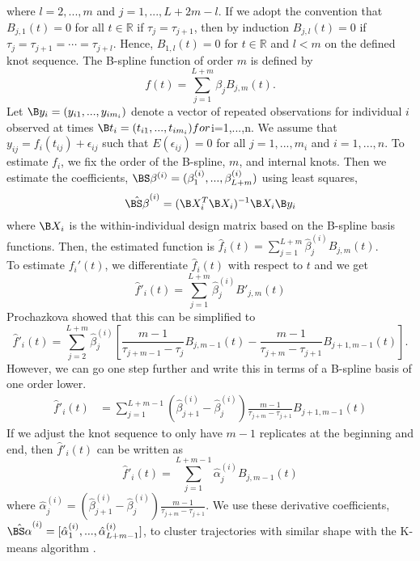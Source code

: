 where $l=2,...,m$ and $j=1,...,L+2m-l$.  If we adopt the convention that $B_{j,1}(t)=0$ for all $t\in\mathbb{R}$ if $\tau_{j}=\tau_{j+1}$, then by induction $B_{j,l}(t)=0$ if $\tau_{j}=\tau_{j+1}=\cdots=\tau_{j+l}$. Hence, $B_{1,l}(t)=0$ for $t\in\mathbb{R}$ and $l<m$ on the defined knot sequence. The B-spline function of order $m$ is defined by
$$f(t) = \sum^{L+m}_{j=1} \beta_j B_{j,m}(t).$$
Let $\B y_{i}=(y_{i1},...,y_{im_{i}})$ denote a vector of repeated observations for individual $i$ observed at times $\B t_{i}=(t_{i1},...,t_{im_{i}})  for $i=1,...,n$.$ We assume that $y_{ij} = f_{i}(t_{ij}) + \epsilon_{ij}$ such that $E(\epsilon_{ij}) = 0$ for all $j=1,...,m_{i}$ and $i=1,...,n$.  To estimate $f_{i}$, we fix the order of the B-spline, $m$, and internal knots. Then we estimate the coefficients, $\BS \beta^{(i)} = (\beta^{(i)}_1,...,\beta^{(i)}_{L+m})$ using least squares, 
$$\hat{\BS \beta}^{(i)} = (\B X_{i}^{T}\B X_{i})^{-1}\B X_{i}\B y_{i}$$
where $\B X_{i}$ is the within-individual design matrix based on the B-spline basis functions. Then, the estimated function is $\hat{f}_i(t)=\sum^{L+m}_{j=1} \hat{\beta}^{(i)}_j B_{j,m}(t)$. \\

To estimate $f_i'(t)$, we differentiate $\hat{f}_i(t)$ with respect to $t$ and we get
$$\hat{f}'_i(t)=\sum^{L+m}_{j=1} \hat{\beta}^{(i)}_j B'_{j,m}(t)$$
Prochazkova \cite{prochazkova2005} showed that this can be simplified to
$$\hat{f}'_i(t)=\sum^{L+m}_{j=2} \hat{\beta}^{(i)}_j \left[\frac{m-1}{\tau_{j+m-1}-\tau_j} B_{j,m-1}(t)-\frac{m-1}{\tau_{j+m}-\tau_{j+1}} B_{j+1,m-1}(t)\right].$$
However, we can go one step further and write this in terms of a B-spline basis of one order lower.
\begin{align*}
\hat{f}'_i(t)&=\sum^{L+m-1}_{j=1} (\hat{\beta}^{(i)}_{j+1} -\hat{\beta}^{(i)}_j)\frac{m-1}{\tau_{j+m}-\tau_{j+1} }B_{j+1,m-1}(t)
\end{align*}
If we adjust the knot sequence to only have $m-1$ replicates at the beginning and end, then $\hat{f}'_{i}(t)$ can be written as
$$\hat{f}'_i(t)=\sum^{L+m-1}_{j=1}\hat{\alpha}^{(i)}_jB_{j,m-1}(t)$$
where $\hat{\alpha}^{(i)}_j= (\hat{\beta}^{(i)}_{j+1} -\hat{\beta}^{(i)}_j)\frac{m-1}{\tau_{j+m}-\tau_{j+1} }$.
We use these derivative coefficients, $\hat{\BS \alpha}^{(i)} = [\hat{\alpha}^{(i)}_1,...,\hat{\alpha}^{(i)}_{ L+m-1}]$, to cluster trajectories with similar shape with the K-means algorithm \cite{macqueen1967, hartigan1979}. 
